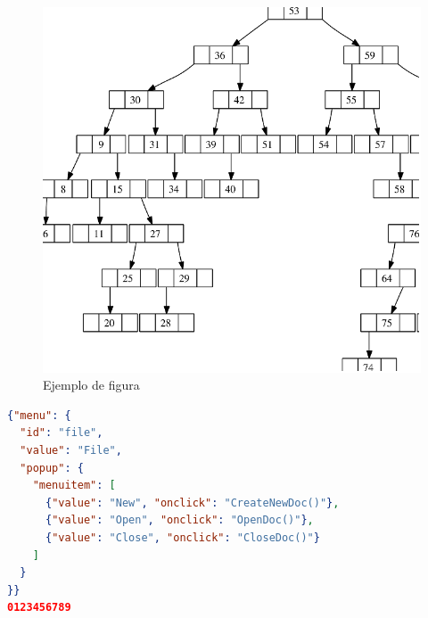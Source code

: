 \begin{figure}[htb]
   \centering
   \includegraphics[width=0.8\linewidth]{images/figura_1}
   \caption{Ejemplo de figura}
   \label{chapter:intro}
\end{figure}


\begin{lstlisting}[language=json,firstnumber=1,caption={Un listado}]
{"menu": {
  "id": "file",
  "value": "File",
  "popup": {
    "menuitem": [
      {"value": "New", "onclick": "CreateNewDoc()"},
      {"value": "Open", "onclick": "OpenDoc()"},
      {"value": "Close", "onclick": "CloseDoc()"}
    ]
  }
}}
0123456789
\end{lstlisting}
